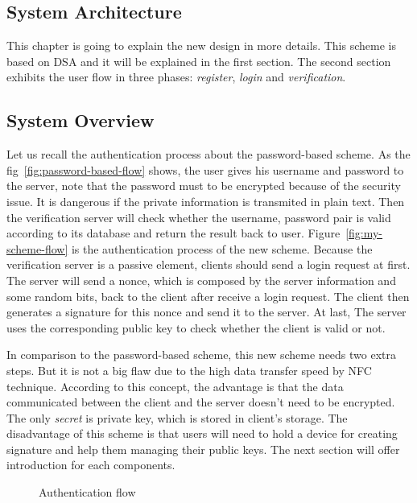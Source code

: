 \begin{CJK}{Bg5}{bsmi}


\chapter{System Architecture}

This chapter is going to explain the new design in more details. This scheme is based on DSA and it will be explained in the first section. The second section exhibits the user flow in three phases: \emph{register}, \emph{login} and \emph{verification}.

\section{System Overview}

Let us recall the authentication process about the password-based scheme. As the fig~\ref{fig:password-based-flow} shows, the user gives his username and password to the server, note that the password must to be encrypted because of the security issue. It is dangerous if the private information is transmited in plain text. Then the verification server will check whether the username, password pair is valid according to its database and return the result back to user. Figure~\ref{fig:my-scheme-flow} is the authentication process of the new scheme. Because the verification server is a passive element, clients should send a login request at first. The server will send a nonce, which is composed by the server information and some random bits, back to the client after receive a login request. The client then generates a signature for this nonce and send it to the server. At last, The server uses the corresponding public key to check whether the client is valid or not.

In comparison to the password-based scheme, this new scheme needs two extra steps. But it is not a big flaw due to the high data transfer speed by NFC technique. According to this concept, the advantage is that the data communicated between the client and the server doesn't need to be encrypted. The only \emph{secret} is private key, which is stored in client's storage. The disadvantage of this scheme is that users will need to hold a device for creating signature and help them managing their public keys. The next section will offer introduction for each components.
\begin{figure}
\centering
{}
\caption{Authentication flow}
\end{figure}


\end{CJK}
